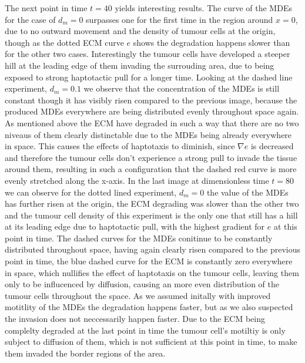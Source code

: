 The next point in time $t=40$ yields interesting results. The curve of the MDEs for the case of $d_m=0$ surpasses one for the first time in the region around $x=0$, due to no outward movement and the density of tumour cells at the origin, though as the dotted ECM curve $e$ shows the degradation happens slower than for the other two cases. Interestingly the tumour cells have developed a steeper hill at the leading edge of them invading the surrouding area, due to being exposed to strong haptotactic pull for a longer time. 
Looking at the dashed line experiment, $d_m = 0.1$ we observe that the concentration of the MDEs is still constant though it has visibly risen compared to the previous image, because the produced MDEs everywhere are being distributed evenly throughout space again. As mentioned above the ECM have degraded in such a way that there are no two niveaus of them clearly distinctable due to the MDEs being already everywhere in space. This causes the effects of haptotaxis to diminish, since $\nabla e$ is decreased and therefore the tumour cells don't experience a strong pull to invade the tissue around them, resulting in such a configuration that the dashed red curve is more evenly stretched along the x-axis.
In the last image at dimensionless time $t=80$ we can observe for the dotted lined experiment, $d_m=0$ the value of the MDEs has further risen at the origin, the ECM degrading was slower than the other two and the tumour cell density of this experiment is the only one that still has a hill at its leading edge due to haptotactic pull, with the highest gradient for $e$ at this point in time. The dashed curves for the MDEs conitinue to be constantly distributed throughout space, having again clearly risen compared to the previous point in time, the blue dashed curve for the ECM is constantly zero everywhere in space, which nullifies the effect of haptotaxis on the tumour cells, leaving them only to be influcenced by diffusion, causing an more even distribution of the tumour cells throughout the space. 
As we assumed initally with improved motitlity of the MDEs the degradation happens faster, but as we also suspected the invasion does not neccessarily happen faster. Due to the ECM being complelty degraded at the last point in time the tumour cell's motiltiy is only subject to diffusion of them, which is not sufficient at this point in time, to make them invaded the border regions of the area.
	

